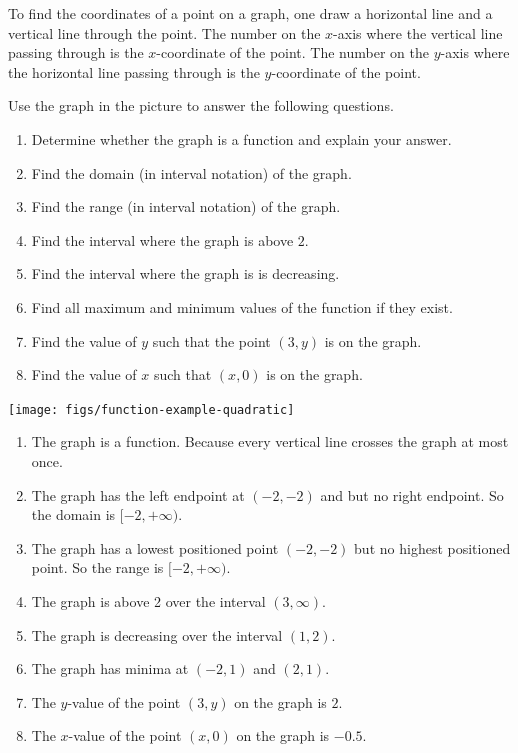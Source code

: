 \documentclass[
  en,11pt]{elegantbook}
\providecommand{\tightlist}{%
  \setlength{\itemsep}{0pt}\setlength{\parskip}{0pt}}
\renewenvironment{example}[1][]{
  \refstepcounter{exam}
  \par\noindent\textbf{\color{main}{\examplename} \theexam #1}
  \rmfamily
}{
  \par\ignorespacesafterend
}
\begin{document}
To find the coordinates of a point on a graph, one draw a horizontal line and a vertical line through the point. The number on the \(x\)-axis where the vertical line passing through is the \(x\)-coordinate of the point. The number on the \(y\)-axis where the horizontal line passing through is the \(y\)-coordinate of the point.

\begin{example}

Use the graph in the picture to answer the following questions.

\begin{enumerate}
\def\labelenumi{\arabic{enumi}.}
\tightlist
\item
  Determine whether the graph is a function and explain your answer.
\item
  Find the domain (in interval notation) of the graph.
\item
  Find the range (in interval notation) of the graph.
\item
  Find the interval where the graph is above \(2\).
\item
  Find the interval where the graph is is decreasing.
\item
  Find all maximum and minimum values of the function if they exist.
\item
  Find the value of \(y\) such that the point \((3, y)\) is on the graph.
\item
  Find the value of \(x\) such that \((x, 0)\) is on the graph.
\end{enumerate}

\end{example}

\begin{center}\texttt{[image: figs/function-example-quadratic]} \end{center}

\begin{solution}



\begin{enumerate}
\def\labelenumi{\arabic{enumi}.}
\tightlist
\item
  The graph is a function. Because every vertical line crosses the graph at most once.
\item
  The graph has the left endpoint at \((-2, -2)\) and but no right endpoint. So the domain is \([-2, +\infty)\).
\item
  The graph has a lowest positioned point \((-2, -2)\) but no highest positioned point. So the range is \([-2, +\infty)\).
\item
  The graph is above 2 over the interval \((3, \infty)\).
\item
  The graph is decreasing over the interval \((1,2)\).
\item
  The graph has minima at \((-2,1)\) and \((2,1)\).
\item
  The \(y\)-value of the point \((3, y)\) on the graph is \(2\).
\item
  The \(x\)-value of the point \((x, 0)\) on the graph is \(-0.5\).
\end{enumerate}

\end{solution}
\end{document}
